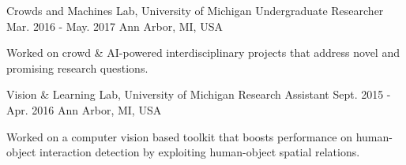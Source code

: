 \begin{cventries}
\cventry
  {Crowds and Machines Lab, University of Michigan} %
  {Undergraduate Researcher } %
  {Mar. 2016 - May. 2017} %
  {Ann Arbor, MI, USA} %
  {
    \begin{cvitems} %
      \item {Worked on crowd \& AI-powered interdisciplinary projects that address novel and promising research questions.}
    \end{cvitems}
  }

\cventry
  {Vision \& Learning Lab, University of Michigan} %
  {Research Assistant } %
  {Sept. 2015 - Apr. 2016} %
  {Ann Arbor, MI, USA} %
  {
    \begin{cvitems} %
      \item {Worked on a computer vision based toolkit that boosts performance on human-object interaction detection by exploiting human-object spatial relations.}
    \end{cvitems}
  }
\end{cventries}






